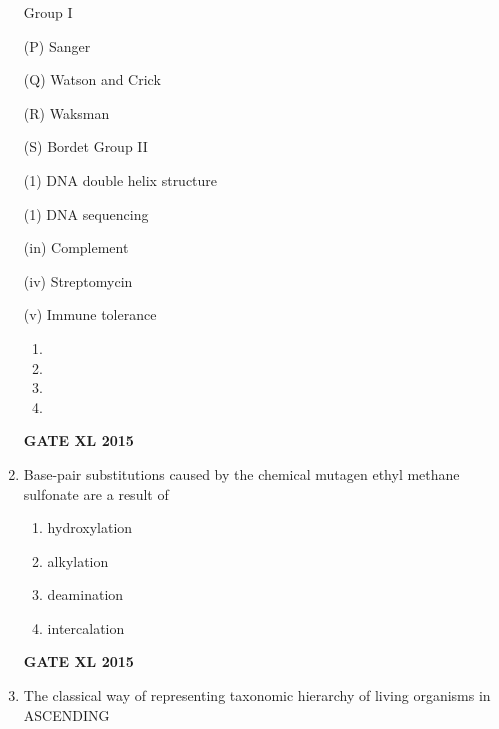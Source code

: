 \documentclass[journal,12pt,onecolumn]{IEEEtran}
\begin{document}
\begin{enumerate}
Group I

(P) Sanger

(Q) Watson and Crick

(R) Waksman

(S) Bordet
Group II

(1) DNA double helix structure

(1) DNA sequencing

(in) Complement

(iv) Streptomycin

(v) Immune tolerance
    \begin{enumerate}
            \item 
	    \item 
	    \item 
            \item 
    \end{enumerate}
\hfill{\textbf{GATE XL 2015}}
\item Base-pair substitutions caused by the chemical mutagen ethyl methane sulfonate are a result of
    \begin{enumerate}
            \item hydroxylation
	    \item alkylation
	    \item deamination
            \item intercalation
    \end{enumerate}
\hfill{\textbf{GATE XL 2015}}
\item  The classical way of representing taxonomic hierarchy of living organisms in ASCENDING


\end{enumerate}
\end{document}
